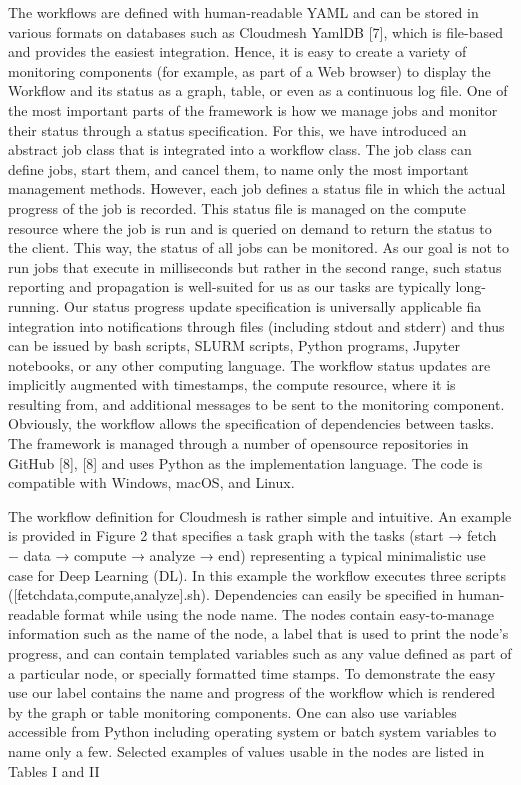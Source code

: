\documentclass[utf8]{FrontiersinVancouver} %
\begin{document}
The workflows are defined with human-readable YAML
and can be stored in various formats on databases such as
Cloudmesh YamlDB [7], which is file-based and provides
the easiest integration. Hence, it is easy to create a variety
of monitoring components (for example, as part of a Web
browser) to display the Workflow and its status as a graph,
table, or even as a continuous log file.
One of the most important parts of the framework is how
we manage jobs and monitor their status through a status
specification. For this, we have introduced an abstract job
class that is integrated into a workflow class. The job class can
define jobs, start them, and cancel them, to name only the most
important management methods. However, each job defines a
status file in which the actual progress of the job is recorded.
This status file is managed on the compute resource where the
job is run and is queried on demand to return the status to the
client. This way, the status of all jobs can be monitored. As our
goal is not to run jobs that execute in milliseconds but rather
in the second range, such status reporting and propagation
is well-suited for us as our tasks are typically long-running.
Our status progress update specification is universally applicable fia integration into notifications through files (including
stdout and stderr) and thus can be issued by bash scripts,
SLURM scripts, Python programs, Jupyter notebooks, or any
other computing language. The workflow status updates are
implicitly augmented with timestamps, the compute resource,
where it is resulting from, and additional messages to be sent
to the monitoring component. Obviously, the workflow allows
the specification of dependencies between tasks.
The framework is managed through a number of opensource repositories in GitHub [8], [8] and uses Python as
the implementation language. The code is compatible with
Windows, macOS, and Linux.

The workflow definition for Cloudmesh is rather simple
and intuitive. An example is provided in Figure 2 that
specifies a task graph with the tasks (start → fetch −
data → compute → analyze → end) representing a
typical minimalistic use case for Deep Learning (DL). In
this example the workflow executes three scripts ([fetchdata,compute,analyze].sh). Dependencies can easily be specified in human-readable format while using the node name. The
nodes contain easy-to-manage information such as the name of
the node, a label that is used to print the node’s progress, and
can contain templated variables such as any value defined as
part of a particular node, or specially formatted time stamps.
To demonstrate the easy use our label contains the name and
progress of the workflow which is rendered by the graph
or table monitoring components. One can also use variables
accessible from Python including operating system or batch
system variables to name only a few. Selected examples of
values usable in the nodes are listed in Tables I and II
\end{document}
